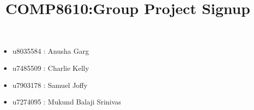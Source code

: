 \documentclass[12pt, a4paper]{article}
\title{COMP8610:Group Project Signup}
\begin{document}
\maketitle
{}
\begin{itemize}
  \item u8035584 : Anusha Garg 
  \item u7485509 : Charlie Kelly
  \item u7903178 : Samuel Joffy
  \item u7274095 : Mukund Balaji Srinivas
\end{itemize}
\end{document}
